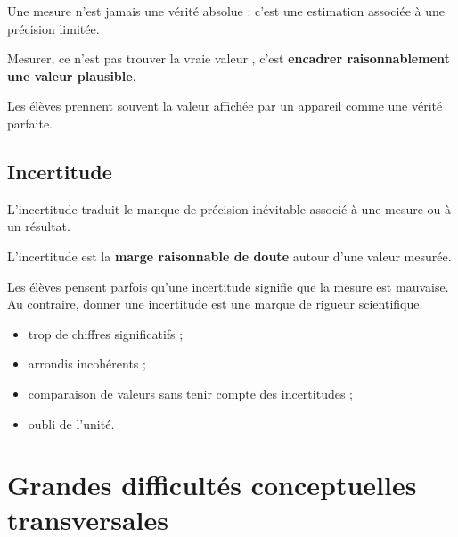 \documentclass[11pt,a4paper]{article}
\begin{document}
\begin{sens}
Une mesure n'est jamais une vérité absolue :
c'est une estimation associée à une précision limitée.
\end{sens}

\begin{imagem}
Mesurer, ce n'est pas \og trouver la vraie valeur \fg,
c'est \textbf{encadrer raisonnablement une valeur plausible}.
\end{imagem}

\begin{fausseintuition}
Les élèves prennent souvent la valeur affichée par un appareil comme une vérité parfaite.
\end{fausseintuition}

\subsection{Incertitude}

\begin{sens}
L'incertitude traduit le manque de précision inévitable associé à une mesure ou à un résultat.
\end{sens}

\begin{imagem}
L'incertitude est la \textbf{marge raisonnable de doute} autour d'une valeur mesurée.
\end{imagem}

\begin{fausseintuition}
Les élèves pensent parfois qu'une incertitude signifie que la mesure est mauvaise.
Au contraire, donner une incertitude est une marque de rigueur scientifique.
\end{fausseintuition}

\begin{erreurs}
\begin{itemize}
    \item trop de chiffres significatifs ;
    \item arrondis incohérents ;
    \item comparaison de valeurs sans tenir compte des incertitudes ;
    \item oubli de l'unité.
\end{itemize}
\end{erreurs}

\newpage

\section{Grandes difficultés conceptuelles transversales}
\end{document}
